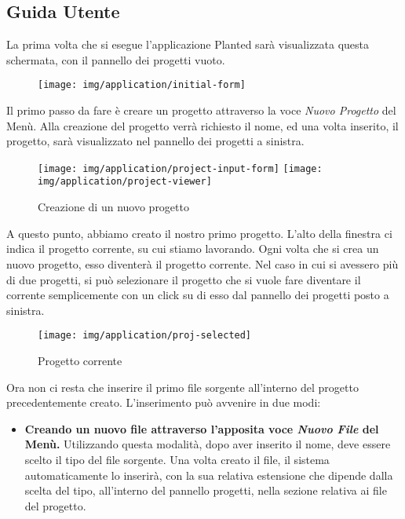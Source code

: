 \documentclass{article}
\begin{document}
  \begin{appendices}
    \section{Guida Utente}
    La prima volta che si esegue l'applicazione Planted sarà visualizzata questa schermata, con il pannello dei progetti vuoto.
    \begin{figure}[H]
      \texttt{[image: img/application/initial-form]}
    \end{figure}
    Il primo passo da fare è creare un progetto attraverso la voce \textit{Nuovo Progetto} del Menù.
    Alla creazione del progetto verrà richiesto il nome, ed una volta inserito, il progetto, sarà visualizzato nel pannello dei progetti a sinistra.
    \begin{figure}[H]
      \centering
      \begin{framed}
        \texttt{[image: img/application/project-input-form]}
        \texttt{[image: img/application/project-viewer]}
      \end{framed}
      \caption{Creazione di un nuovo progetto}
    \end{figure}
    A questo punto, abbiamo creato il nostro primo progetto. L'alto della finestra ci indica il progetto corrente, su cui stiamo lavorando. Ogni volta che si crea
    un nuovo progetto, esso diventerà il progetto  corrente. Nel caso in cui si avessero più di due progetti, si può selezionare il progetto che si vuole fare
    diventare il corrente semplicemente con un click su di esso dal pannello dei progetti posto a sinistra.
    \begin{figure}[H]
      \centering
      \texttt{[image: img/application/proj-selected]}
      \caption{Progetto corrente}
    \end{figure}
    \newpage
    Ora non ci resta che inserire il primo file sorgente all'interno del progetto precedentemente creato. L'inserimento può avvenire in due modi:
    \begin{itemize}
      \item \textbf{Creando un nuovo file attraverso l'apposita voce \textit{Nuovo File} del Menù.} Utilizzando questa modalità, dopo aver inserito il nome, deve essere scelto
      il tipo del file sorgente. Una volta creato il file, il sistema automaticamente lo inserirà, con la sua relativa estensione che dipende dalla scelta del tipo,
      all'interno del pannello progetti, nella sezione relativa ai file del progetto.

\end{itemize}
\end{appendices}
\end{document}
